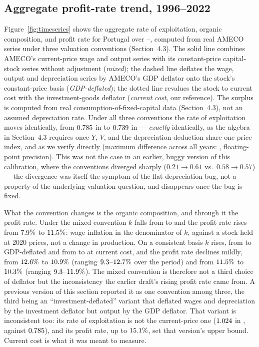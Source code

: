 \documentclass[11pt]{article}
\begin{document}
\subsection{Aggregate profit-rate trend, 1996--2022}

Figure~\ref{fig:timeseries} shows the aggregate rate of exploitation,
organic composition, and profit rate for Portugal over
\AmFirstYear--\AmLastYear, computed from real AMECO series under three
valuation conventions (Section~4.3). The solid line combines AMECO's
current-price wage and output series with its constant-price
capital-stock series without adjustment (\emph{mixed}); the dashed line
deflates the wage, output and depreciation series by AMECO's GDP deflator
onto the stock's constant-price basis (\emph{GDP-deflated}); the dotted
line revalues the stock to current cost with the investment-goods
deflator (\emph{current cost}, our reference). The surplus is computed
from real consumption-of-fixed-capital data (Section~4.3), not an assumed
depreciation rate. Under all three conventions the rate of exploitation
moves identically, from $0.785$ in \AmFirstYear{} to
$0.739$ in \AmLastYear{} --- \emph{exactly} identically, as the
algebra in Section~4.3 requires once $Y$, $V$, and the depreciation
deduction share one price index, and as we verify directly (maximum
difference across all years: \AmPtEGapExp, floating-point precision).
This was not the case in an earlier, buggy version of this calibration,
where the conventions diverged sharply ($0.21\to0.61$ vs.\
$0.58\to0.57$) --- the divergence was itself the symptom of the
flat-depreciation bug, not a property of the underlying valuation
question, and disappears once the bug is fixed.

What the convention changes is the organic composition, and through it
the profit rate. Under the mixed convention $k$ falls from
\AmPtCurExKFirst{} to \AmPtCurExKLast{} and the profit rate rises from
$7.9\%$ to $11.5\%$: wage inflation in the
denominator of $k$, against a stock held at 2020 prices, not a change in
production. On a consistent basis $k$ rises, from \AmPtGdpExKFirst{} to
\AmPtGdpExKLast{} GDP-deflated and from \AmPtCcExKFirst{} to
\AmPtCcExKLast{} at current cost, and the profit rate declines mildly,
from $12.6\%$ to $10.9\%$ (ranging
$9.3$--$12.7\%$ over the period) and from
$11.5\%$ to $10.3\%$ (ranging
$9.3$--$11.9\%$). The mixed convention is therefore
not a third choice of deflator but the inconsistency the earlier draft's
rising profit rate came from. A previous version of this section reported
it as one convention among three, the third being an
``investment-deflated'' variant that deflated wages and depreciation by
the investment deflator but output by the GDP deflator. That variant is
inconsistent too: its rate of exploitation is not the current-price one
($1.024$ in \AmFirstYear, against $0.785$), and
its profit rate, up to $15.1\%$, set that version's upper
bound. Current cost is what it was meant to measure.
\end{document}
